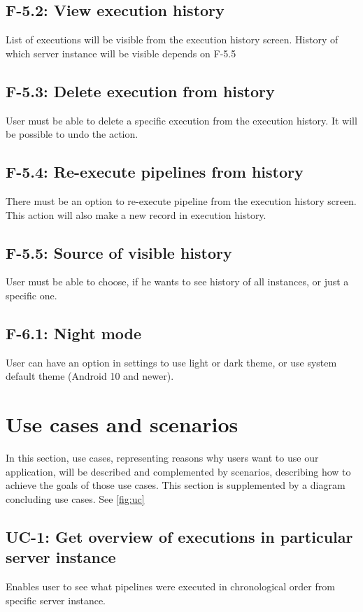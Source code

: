 \subsection*{F-5.2: View execution history}
List of executions will be visible from the execution history screen. History of which server instance will be visible depends on F-5.5
\subsection*{F-5.3: Delete execution from history}
User must be able to delete a specific execution from the execution history. It will be possible to undo the action.
\subsection*{F-5.4: Re-execute pipelines from history}
There must be an option to re-execute pipeline from the execution history screen. This action will also make a new record in execution history.
\subsection*{F-5.5: Source of visible history}
User must be able to choose, if he wants to see history of all instances, or just a specific one.
\subsection*{F-6.1: Night mode}
User can have an option in settings to use light or dark theme, or use system default theme (Android 10 and newer).












\section{Use cases and scenarios}
In this section, use cases, representing reasons why users want to use our application, will be described and complemented by scenarios, describing how to achieve the goals of those use cases.
This section is supplemented by a diagram concluding use cases.
See \autoref{fig:uc}


\subsection*{UC-1: Get overview of executions in particular server instance}
Enables user to see what pipelines were executed in chronological order from specific server instance.

